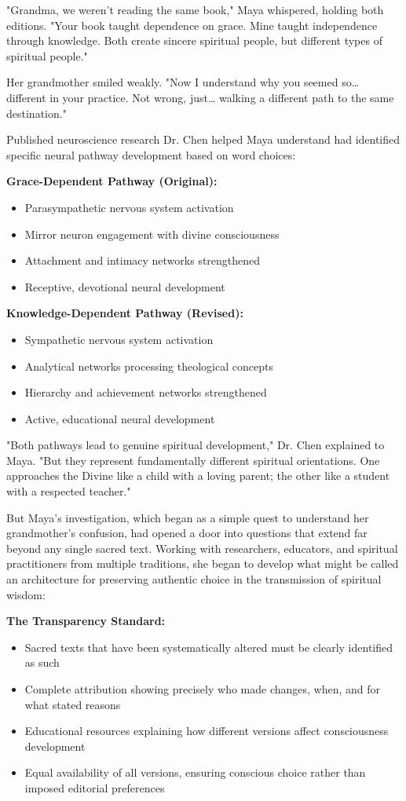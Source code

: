 \documentclass[12pt,twoside]{book}
\begin{document}
"Grandma, we weren't reading the same book," Maya whispered, holding both editions. "Your book taught dependence on grace. Mine taught independence through knowledge. Both create sincere spiritual people, but different types of spiritual people."

Her grandmother smiled weakly. "Now I understand why you seemed so\ldots{} different in your practice. Not wrong, just\ldots{} walking a different path to the same destination."

Published neuroscience research Dr. Chen helped Maya understand had identified specific neural pathway development based on word choices:

\textbf{\textbf{Grace-Dependent Pathway (Original):}}
\begin{itemize}
\item Parasympathetic nervous system activation
\item Mirror neuron engagement with divine consciousness
\item Attachment and intimacy networks strengthened
\item Receptive, devotional neural development
\end{itemize}

\textbf{\textbf{Knowledge-Dependent Pathway (Revised):}}
\begin{itemize}
\item Sympathetic nervous system activation
\item Analytical networks processing theological concepts
\item Hierarchy and achievement networks strengthened
\item Active, educational neural development
\end{itemize}

"Both pathways lead to genuine spiritual development," Dr. Chen explained to Maya. "But they represent fundamentally different spiritual orientations. One approaches the Divine like a child with a loving parent; the other like a student with a respected teacher."

But Maya's investigation, which began as a simple quest to understand her grandmother's confusion, had opened a door into questions that extend far beyond any single sacred text. Working with researchers, educators, and spiritual practitioners from multiple traditions, she began to develop what might be called an architecture for preserving authentic choice in the transmission of spiritual wisdom:

\textbf{\textbf{The Transparency Standard:}}
\begin{itemize}
\item Sacred texts that have been systematically altered must be clearly identified as such
\item Complete attribution showing precisely who made changes, when, and for what stated reasons
\item Educational resources explaining how different versions affect consciousness development
\item Equal availability of all versions, ensuring conscious choice rather than imposed editorial preferences
\end{itemize}
\end{document}
